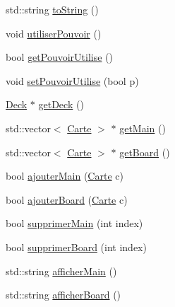 \begin{DoxyCompactItemize}
\item 
std\-::string \hyperlink{class_joueur_a99e2e0934bb9307f577d9fa3f219a7b6}{to\-String} ()
\item 
void \hyperlink{class_joueur_a91239ad650edadbee5b1b51d19242d28}{utiliser\-Pouvoir} ()
\item 
bool \hyperlink{class_joueur_a0344bd2b30346f73e23239b62647e26d}{get\-Pouvoir\-Utilise} ()
\item 
void \hyperlink{class_joueur_a57f6f8d3ff6ba9b5026a51b23e03cd0a}{set\-Pouvoir\-Utilise} (bool p)
\item 
\hyperlink{class_deck}{\-Deck} $\ast$ \hyperlink{class_joueur_a5f7a140f00766144edf7d6a5b0f236b7}{get\-Deck} ()
\item 
std\-::vector$<$ \hyperlink{class_carte}{\-Carte} $>$ $\ast$ \hyperlink{class_joueur_a569fa77a585a0e82981bfa6bda149a4f}{get\-Main} ()
\item 
std\-::vector$<$ \hyperlink{class_carte}{\-Carte} $>$ $\ast$ \hyperlink{class_joueur_abe6504e86cf56787e5569c296e3bfde7}{get\-Board} ()
\item 
bool \hyperlink{class_joueur_a0b94001f3dd61af944bd7128d143ac11}{ajouter\-Main} (\hyperlink{class_carte}{\-Carte} c)
\item 
bool \hyperlink{class_joueur_a5046cd3251b93c58558ca273db1aa23b}{ajouter\-Board} (\hyperlink{class_carte}{\-Carte} c)
\item 
bool \hyperlink{class_joueur_ae1c641d98c6e9fda547c3b7e923f085e}{supprimer\-Main} (int index)
\item 
bool \hyperlink{class_joueur_af086855b254a628bc9c07047142fb33c}{supprimer\-Board} (int index)
\item 
std\-::string \hyperlink{class_joueur_a4a41ec6aaa2e7b4a55807b86cc286876}{afficher\-Main} ()
\item 
std\-::string \hyperlink{class_joueur_aae890e668b097dddee94a61404553c8f}{afficher\-Board} ()
\end{DoxyCompactItemize}


